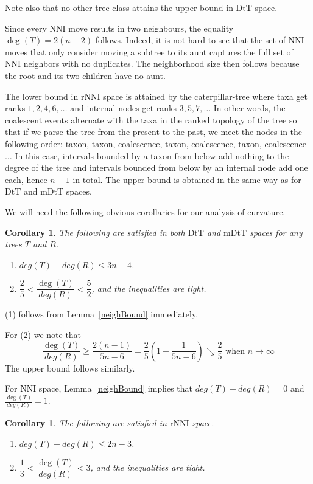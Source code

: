 \documentclass{amsart}
\newtheorem{corollary}[lemma]{Corollary}
\newcommand{\dts}{\mathrm{DtT}}
\newcommand{\nni}{\mathrm{NNI}}
\newcommand{\rnni}{\mathrm{rNNI}}
\newcommand{\mdts}{\mathrm{mDtT}}
\begin{document}
Note also that no other tree class attains the upper bound in $\dts$ space.

Since every NNI move results in two neighbours, the equality $\deg(T) = 2(n-2)$ follows.
Indeed, it is not hard to see that the set of NNI moves that only consider moving a subtree to its aunt captures the full set of NNI neighbors with no duplicates.
The neighborhood size then follows because the root and its two children have no aunt.

The lower bound in $\rnni$ space is attained by the caterpillar-tree where taxa get ranks $1, 2, 4, 6, \ldots$ and internal nodes get ranks $3, 5, 7, \ldots$
In other words, the coalescent events alternate with the taxa in the ranked topology of the tree so that if we parse the tree from the present to the past, we meet the nodes in the following order: taxon, taxon, coalescence, taxon, coalescence, taxon, coalescence$\ldots$
In this case, intervals bounded by a taxon from below add nothing to the degree of the tree and intervals bounded from below by an internal node add one each, hence $n-1$ in total.
The upper bound is obtained in the same way as for $\dts$ and $\mdts$ spaces.
\endproof

We will need the following obvious corollaries for our analysis of curvature.

\begin{corollary}\label{degreeBounds}
The following are satisfied in both $\dts$ and $\mdts$ spaces for any trees $T$ and $R$.
\begin{enumerate}[(1)]
\item $deg(T)-deg(R) \leq 3n-4$.
\item $\dfrac25 < \dfrac{\deg(T)}{deg(R)} < \dfrac52$, and the inequalities are tight.
\end{enumerate}
\end{corollary}

\proof
(1) follows from Lemma~\ref{neighBound} immediately.

For (2) we note that
\[
\frac{\deg(T)}{deg(R)} \geq \frac{2(n-1)}{5n-6} = \frac25 (1 + \frac{1}{5n-6}) \searrow \frac 25 \mbox{ when } n\to\infty
\]
The upper bound follows similarly.
\endproof

For $\nni$ space, Lemma~\ref{neighBound} implies that $deg(T)-deg(R) = 0$ and $\frac{\deg(T)}{deg(R)} = 1$.

\begin{corollary}\label{degreeBoundsNNI}
The following are satisfied in $\rnni$ space.
\begin{enumerate}[(1)]
\item $deg(T)-deg(R) \leq 2n-3$.
\item $\dfrac13 < \dfrac{\deg(T)}{deg(R)} < 3$, and the inequalities are tight.
\end{enumerate}
\end{corollary}
\end{document}

